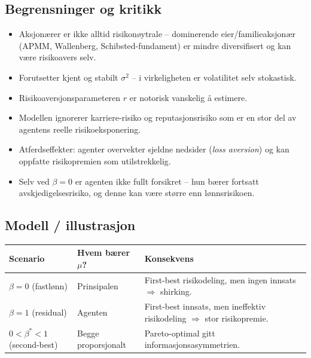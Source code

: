 \subsection*{Begrensninger og kritikk}
\begin{itemize}\setlength{\itemsep}{1pt}
\item Aksjonærer er ikke alltid risikonøytrale -- dominerende eier/familieaksjonær (APMM, Wallenberg, Schibsted-fundament) er mindre diversifisert og kan være risikoavers selv.
\item Forutsetter kjent og stabilt $\sigma^{2}$ -- i virkeligheten er volatilitet selv stokastisk.
\item Risikoaversjonsparameteren $r$ er notorisk vanskelig å estimere.
\item Modellen ignorerer karriere-risiko og reputasjonsrisiko som er en stor del av agentens reelle risikoeksponering.
\item Atferdseffekter: agenter overvekter sjeldne nedsider (\emph{loss aversion}) og kan oppfatte risikopremien som utilstrekkelig.
\item Selv ved $\beta=0$ er agenten ikke fullt forsikret -- hun bærer fortsatt avskjedigelsesrisiko, og denne kan være større enn lønnsrisikoen.
\end{itemize}

\subsection*{Modell / illustrasjon}

\begin{center}
\renewcommand{\arraystretch}{1.15}
\begin{tabular}{@{}p{3.8cm}p{4.2cm}p{6.0cm}@{}}
\toprule
\textbf{Scenario} & \textbf{Hvem bærer $\mu$?} & \textbf{Konsekvens} \\
\midrule
$\beta=0$ (fastlønn) & Prinsipalen & First-best risikodeling, men ingen innsats $\Rightarrow$ shirking. \\
$\beta=1$ (residual) & Agenten & First-best innsats, men ineffektiv risikodeling $\Rightarrow$ stor risikopremie. \\
$0<\beta^{*}<1$ (second-best) & Begge proporsjonalt & Pareto-optimal gitt informasjonsasymmetrien. \\
\bottomrule
\end{tabular}
\end{center}

